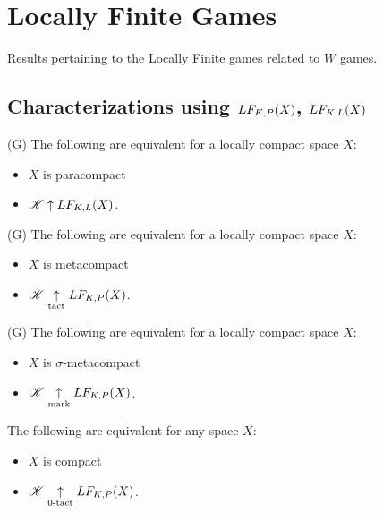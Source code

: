 
\chapter{Locally Finite Games}

Results pertaining to the Locally Finite games related to $W$ games.

\section{Characterizations using $LF_{K,P}(X)$, $LF_{K,L}(X)$}

\begin{thm}(G)
  The following are equivalent for a locally compact space $X$:
    \begin{itemize}
      \item $X$ is paracompact
      \item $\mathscr{K} \uparrow LF_{K,L}(X)$.
    \end{itemize}
\end{thm}

\begin{thm}(G)
  The following are equivalent for a locally compact space $X$:
    \begin{itemize}
      \item $X$ is metacompact
      \item $\mathscr{K} \underset{\text{tact}}{\uparrow} LF_{K,P}(X)$.
    \end{itemize}
\end{thm}

\begin{thm}(G)
  The following are equivalent for a locally compact space $X$:
    \begin{itemize}
      \item $X$ is $\sigma$-metacompact
      \item $\mathscr{K} \underset{\text{mark}}{\uparrow} LF_{K,P}(X)$.
    \end{itemize}
\end{thm}

\begin{obs}
  The following are equivalent for any space $X$:
    \begin{itemize}
      \item $X$ is compact
      \item $\mathscr{K} \underset{0\text{-tact}}{\uparrow} LF_{K,P}(X)$.
    \end{itemize}
\end{obs}

